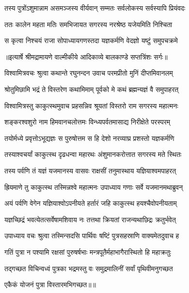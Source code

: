 \twolineshloka
{तस्य पुत्रोंऽशुमान्नाम असमञ्जस्य वीर्यवान्}
{सम्मतः सर्वलोकस्य सर्वस्यापि प्रियंवदः} %

\twolineshloka
{ततः कालेन महता मतिः समभिजायत}
{सगरस्य नरश्रेष्ठ यजेयमिति निश्चिता} %

\twolineshloka
{स कृत्वा निश्चयं राजा सोपाध्यायगणस्तदा}
{यज्ञकर्मणि वेदज्ञो यष्टुं समुपचक्रमे} %


{॥इत्यार्षे श्रीमद्रामायणे वाल्मीकीये आदिकाव्ये बालकाण्डे सप्तत्रिंशः सर्गः॥}


\twolineshloka
{विश्वामित्रवचः श्रुत्वा कथान्ते रघुनन्दन}
{उवाच परमप्रीतो मुनिं दीप्तमिवानलम्} %

\twolineshloka
{श्रोतुमिछामि भद्रं ते विस्तरेण कथामिमाम्}
{पूर्वको मे कथं ब्रह्मन्यज्ञं वै समुपाहरत्} %

\twolineshloka
{विश्वामित्रस्तु काकुत्स्थमुवाच प्रहसन्निव}
{श्रूयतां विस्तरो राम सगरस्य महात्मनः} %

\twolineshloka
{शङ्करश्वशुरो नाम हिमवानचलोत्तमः}
{विन्ध्यपर्वतमासाद्य निरीक्षेते परस्परम्} %

\twolineshloka
{तयोर्मध्ये प्रवृत्तोऽभूद्यज्ञः स पुरुषोत्तम}
{स हि देशो नरव्याघ्र प्रशस्तो यज्ञकर्मणि} %

\twolineshloka
{तस्याश्वचर्यां काकुत्स्थ दृढधन्वा महारथः}
{अंशुमानकरोत्तात सगरस्य मते स्थितः} %

\twolineshloka
{तस्य पर्वणि तं यज्ञं यजमानस्य वासवः}
{राक्षसीं तनुमास्थाय यज्ञियाश्वमपाहरत्} %

\twolineshloka
{ह्रियमाणे तु काकुत्स्थ तस्मिन्नश्वे महात्मनः}
{उपाध्याय गणाः सर्वे यजमानमथाब्रुवन्} %

\twolineshloka
{अयं पर्वणि वेगेन यज्ञियाश्वोऽपनीयते}
{हर्तारं जहि काकुत्स्थ हयश्चैवोपनीयताम्} %

\twolineshloka
{यज्ञच्छिद्रं भवत्येतत्सर्वेषामशिवाय नः}
{तत्तथा क्रियतां राजन्यथाछिद्रः क्रतुर्भवेत्} %

\twolineshloka
{उपाध्याय वचः श्रुत्वा तस्मिन्सदसि पार्थिवः}
{षष्टिं पुत्रसहस्राणि वाक्यमेतदुवाच ह} %

\twolineshloka
{गतिं पुत्रा न पश्यामि रक्षसां पुरुषर्षभाः}
{मन्त्रपूतैर्महाभागैरास्थितो हि महाक्रतुः} %

\twolineshloka
{तद्गच्छत विचिन्वध्वं पुत्रका भद्रमस्तु वः}
{समुद्रमालिनीं सर्वां पृथिवीमनुगच्छत} %

{एकैकं योजनं पुत्रा विस्तारमभिगच्छत॥॥} %

